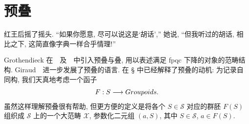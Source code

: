\section{预叠}\label{src:3.4}
\begin{epigraph}
红王后摇了摇头. ``如果你愿意, 尽可以说这是`胡话','' 她说, ``但我听过的胡话, 相比之下, 这简直像字典一样合乎情理!''
\end{epigraph}
Grothendieck 在~\cite[§A.1]{FGAI}~及~\cite[§6]{SGA1}~中引入预叠与叠, 用以表述满足 fpqc 下降的对象的范畴结构. Giraud~\cite{Gir64,Gir71}~进一步发展了预叠的语言. 在 \S{} 中已经解释了预叠的动机: 为记录自同构, 我们天真地考虑一个函子
\[
F:S\longrightarrow Groupoids.
\]
虽然这样理解预叠很有帮助, 但更方便的定义是将各个 $S\in\mathcal S$ 对应的群胚 $F(S)$ 组织成 $\mathcal S$ 上的一个大范畴 $\mathcal X$, 参数化二元组 $(a,S)$, 其中 $S\in\mathcal S$, $a\in F(S)$.

